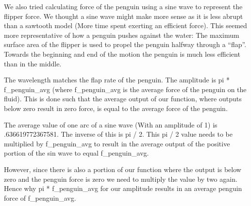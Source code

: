 \documentclass[11pt]{article}
\begin{document}
We also tried calculating force of the penguin using a sine wave to
represent the flipper force. We thought a sine wave might make more
sense as it is less abrupt than a sawtooth model (More time spent
exerting an efficient force). This seemed more representative of how a
penguin pushes against the water: The maximum surface area of the
flipper is used to propel the penguin halfway through a ``flap''.
Towards the beginning and end of the motion the penguin is much less
efficient than in the middle.

The wavelength matches the flap rate of the penguin. The amplitude is pi
* f\_penguin\_avg (where f\_penguin\_avg is the average force of the
penguin on the fluid). This is done such that the average output of our
function, where outputs below zero result in zero force, is equal to the
average force of the penguin.

The average value of one arc of a sine wave (With an amplitude of 1) is
.636619772367581. The inverse of this is pi / 2. This pi / 2 value needs
to be multiplied by f\_penguin\_avg to result in the average output of
the positive portion of the sin wave to equal f\_penguin\_avg.

However, since there is also a portion of our function where the output
is below zero and the penguin force is zero we need to multiply the
value by two again. Hence why pi * f\_penguin\_avg for our amplitude
results in an average penguin force of f\_penguin\_avg.
\end{document}
